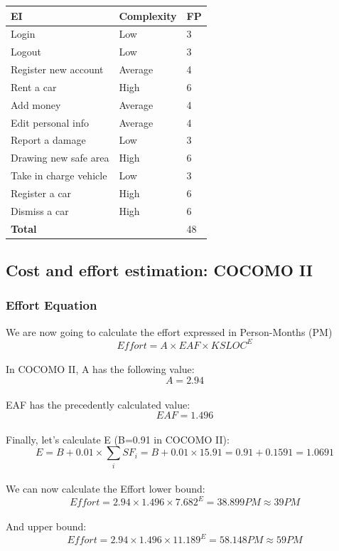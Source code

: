 \documentclass{article}
\begin{document}
\begin{tabular}{|p{5cm}|p{3cm}|p{2cm}|}
\hline
\textbf{EI} & \textbf{Complexity} & \textbf{FP} \\
\hline
Login & Low & 3\\
Logout & Low & 3\\
Register new account & Average & 4 \\
Rent a car & High & 6 \\
Add money & Average & 4 \\
Edit personal info & Average & 4 \\
Report a damage & Low & 3 \\
Drawing new safe area & High & 6\\
Take in charge vehicle & Low & 3\\
Register a car & High & 6\\
Dismiss a car & High & 6\\
\hline
\multicolumn{2}{|l|}{\textbf{Total}} & 48\\
\hline
\end{tabular}




\subsection{Cost and effort estimation: COCOMO II}



\subsubsection{Effort Equation}
We are now going to calculate the effort expressed in Person-Months (PM)\\

$$\displaystyle Effort = A \times EAF \times KSLOC^E $$ \\
In COCOMO II, A has the following value:\\
$$\displaystyle A = 2.94 $$ \\
EAF has the precedently calculated value:\\
$$\displaystyle EAF = 1.496 $$ \\
Finally, let's calculate E (B=0.91 in COCOMO II):
$$\displaystyle E = B + 0.01 \times \sum_{i}SF_i = B + 0.01 \times 15.91 = 0.91 + 0.1591 = 1.0691  $$ \\
We can now calculate the Effort lower bound: \\
$$\displaystyle Effort = 2.94 \times 1.496 \times 7.682^E = 38.899 PM \approx 39PM $$ \\
And upper bound:\\
$$\displaystyle Effort = 2.94 \times 1.496 \times 11.189^E = 58.148 PM \approx 59PM $$ \\
\end{document}
